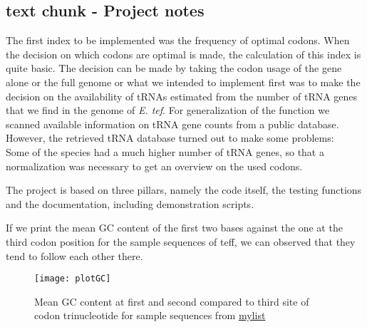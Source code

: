 \subsection{text chunk - Project notes}
The first index to be implemented was the frequency of optimal codons. When the decision on which codons are optimal is made, the calculation of this index is quite basic. The decision can be made by taking the codon usage of the gene alone or the full genome or what we intended to implement first was to make the decision on the availability of tRNAs estimated from the number of tRNA genes that we find in the genome of \textit{E. tef}. For generalization of the function we scanned available information on tRNA gene counts from a public database. However, the retrieved tRNA database turned out to make some problems: \\
Some of the species had a much higher number of tRNA genes, so that a normalization was necessary to get an overview on the used codons. %


The project is based on three pillars, namely the code itself, the testing functions and the documentation, including demonstration scripts.


If we print the mean GC content of the first two bases against the one at the third codon position for the sample sequences of teff, we can observed that they tend to follow each other there. 

\begin{figure}[tb] 
\centering 
\texttt{[image: plotGC]} 
\caption[GC percentage at synonymous sites]{Mean GC content at first and second compared to third site of codon trinucleotide for sample sequences from \hyperlink{function:mylist}{mylist}}
\label{fig:plotGC} 
\end{figure} 


